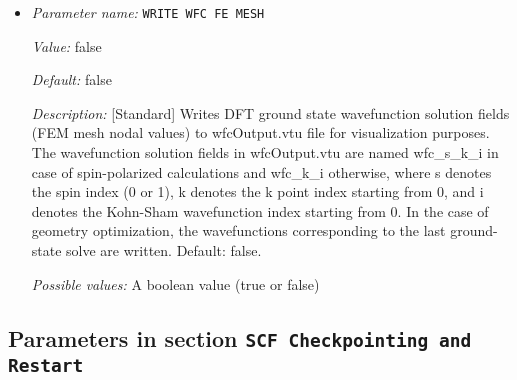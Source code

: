 \begin{itemize}
{\it Default:} false


{\it Description:} [Standard] Computes projected density of states on each atom using Lorentzians. Uses specified Temperature for SCF as the broadening parameter. Outputs a file name 'pdosData_x' with x denoting atomID. This file contains columns with first column indicating the energy in eV and all other columns indicating projected density of states corresponding to single atom wavefunctions.


{\it Possible values:} A boolean value (true or false)
\item {\it Parameter name:} {\tt WRITE WFC FE MESH}
\label{parameters:Post_2dprocessing Options/WRITE WFC FE MESH}
\label{parameters:Post_2dprocessing_20Options/WRITE_20WFC_20FE_20MESH}


{\it Value:} false


{\it Default:} false


{\it Description:} [Standard] Writes DFT ground state wavefunction solution fields (FEM mesh nodal values) to wfcOutput.vtu file for visualization purposes. The wavefunction solution fields in wfcOutput.vtu are named wfc_s_k_i in case of spin-polarized calculations and wfc_k_i otherwise, where s denotes the spin index (0 or 1), k denotes the k point index starting from 0, and i denotes the Kohn-Sham wavefunction index starting from 0. In the case of geometry optimization, the wavefunctions corresponding to the last ground-state solve are written.  Default: false.


{\it Possible values:} A boolean value (true or false)
\end{itemize}

\subsection{Parameters in section \tt SCF Checkpointing and Restart}
\label{parameters:SCF_20Checkpointing_20and_20Restart}

